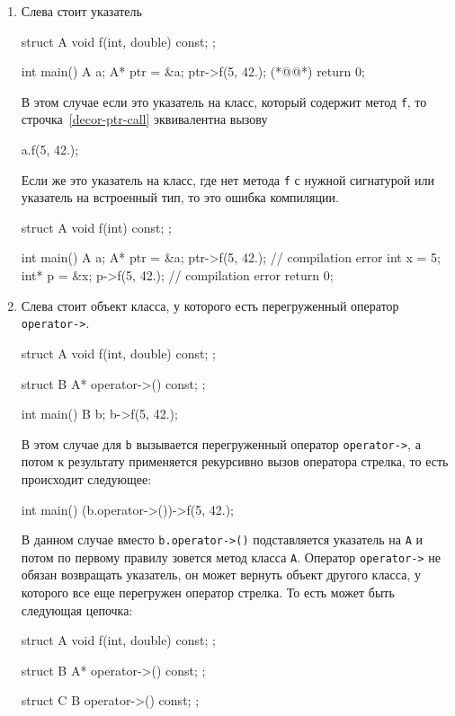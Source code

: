 \begin{enumerate}
\item Слева стоит указатель
\begin{cppcode}
struct A {
  void f(int, double) const;
};

int main() {
  A a;
  A* ptr = &a;
  ptr->f(5, 42.); (*@@*)
  return 0;
}
\end{cppcode}
В этом случае если это указатель на класс, который содержит метод \verb"f", то строчка~\ref{decor-ptr-call} эквивалентна вызову
\begin{cppcode}
a.f(5, 42.);
\end{cppcode}
Если же это указатель на класс, где нет метода \verb"f" с нужной сигнатурой или указатель на встроенный тип, то это ошибка компиляции.
\begin{cppcode}
struct A {
  void f(int) const;
};

int main() {
  A a;
  A* ptr = &a;
  ptr->f(5, 42.); // compilation error
  int x = 5;
  int* p = &x;
  p->f(5, 42.); // compilation error
  return 0;
}
\end{cppcode}

\item Слева стоит объект класса, у которого есть перегруженный оператор \verb"operator->".
\begin{cppcode}
struct A {
  void f(int, double) const;
};

struct B {
  A* operator->() const;
};

int main() {
  B b;
  b->f(5, 42.);
}
\end{cppcode}
В этом случае для \verb"b" вызывается перегруженный оператор \verb"operator->", а потом к результату применяется рекурсивно вызов оператора стрелка, то есть происходит следующее:
\begin{cppcode}
int main() {
  (b.operator->())->f(5, 42.);
}
\end{cppcode}
В данном случае вместо \verb"b.operator->()" подставляется указатель на \verb"A" и потом по первому правилу зовется метод класса \verb"A".
Оператор \verb"operator->" не обязан возвращать указатель, он может вернуть объект другого класса, у которого все еще перегружен оператор стрелка.
То есть может быть следующая цепочка:
\begin{cppcode}
struct A {
  void f(int, double) const;
};

struct B {
  A* operator->() const;
};

struct C {
  B operator->() const;
};


\end{cppcode}
\end{enumerate}
